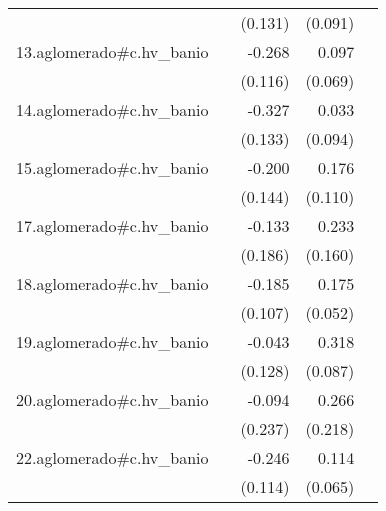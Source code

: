 {\begin{longtable}{l*{4}{D{.}{.}{-1}}}
            &                     &     (0.131)         &     (0.091)         &                     \\
\addlinespace
13.aglomerado#c.hv\_banio&                     &      -0.268\sym{*}  &       0.097         &                     \\
            &                     &     (0.116)         &     (0.069)         &                     \\
\addlinespace
14.aglomerado#c.hv\_banio&                     &      -0.327\sym{*}  &       0.033         &                     \\
            &                     &     (0.133)         &     (0.094)         &                     \\
\addlinespace
15.aglomerado#c.hv\_banio&                     &      -0.200         &       0.176         &                     \\
            &                     &     (0.144)         &     (0.110)         &                     \\
\addlinespace
17.aglomerado#c.hv\_banio&                     &      -0.133         &       0.233         &                     \\
            &                     &     (0.186)         &     (0.160)         &                     \\
\addlinespace
18.aglomerado#c.hv\_banio&                     &      -0.185         &       0.175\sym{***}&                     \\
            &                     &     (0.107)         &     (0.052)         &                     \\
\addlinespace
19.aglomerado#c.hv\_banio&                     &      -0.043         &       0.318\sym{***}&                     \\
            &                     &     (0.128)         &     (0.087)         &                     \\
\addlinespace
20.aglomerado#c.hv\_banio&                     &      -0.094         &       0.266         &                     \\
            &                     &     (0.237)         &     (0.218)         &                     \\
\addlinespace
22.aglomerado#c.hv\_banio&                     &      -0.246\sym{*}  &       0.114         &                     \\
            &                     &     (0.114)         &     (0.065)         &                     \\

\end{longtable}}
